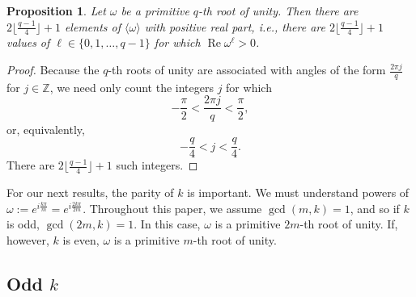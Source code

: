 \documentclass{amsart}
\renewcommand{\Re}{\operatorname{Re}}
\newtheorem{proposition}{Proposition}
\theoremstyle{definition}
\theoremstyle{remark}
\begin{document}
\begin{proposition}\label{rightside}
    Let $\omega$ be a primitive $q$-th root of unity. Then there are $2\lfloor\frac{q-1}{4}\rfloor + 1$ elements of $\langle \omega \rangle$ with positive real part, i.e., there are $2\lfloor\frac{q-1}{4}\rfloor + 1$ values of $\ell \in \{0, 1, \ldots, q-1\}$ for which $\Re \omega^\ell >0$. 
\end{proposition}
\begin{proof}
Because the $q$-th roots of unity are associated with angles of the form $\frac{2\pi j}{q}$ for $j \in \mathbb{Z}$, we need only count the integers $j$ for which
\[
-\frac{\pi}{2} < \frac{2 \pi j}{q} < \frac{\pi}{2},
\]
or, equivalently,
\[
-\frac{q}{4} < j < \frac{q}{4}. 
\]
There are $2 \lfloor \frac{q-1}{4} \rfloor+1$ such integers. 
\end{proof}

%
%
%

For our next results, the parity of $k$ is important. We must understand powers of $\omega := e^{i\frac{k \pi}{m}} = e^{i\frac{2 k \pi}{2m}}$. Throughout this paper, we assume $\gcd(m,k) = 1$, and so if $k$ is odd, $\gcd(2m,k) =1$. In this case, $\omega$ is a primitive $2m$-th root of unity. If, however, $k$ is even, $\omega$ is a primitive $m$-th root of unity. 

\subsection{Odd $k$}
\end{document}

